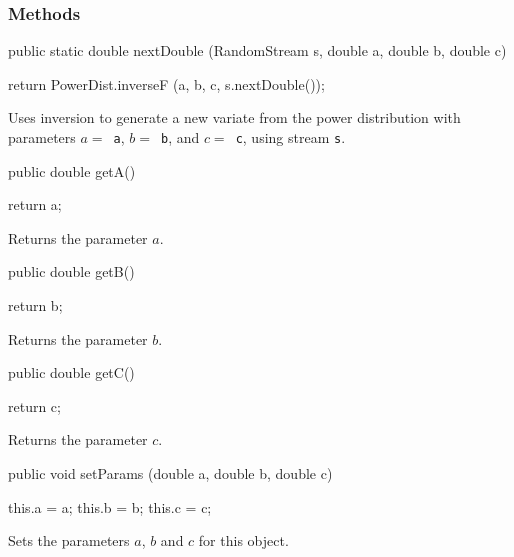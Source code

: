 \subsubsection* {Methods}
\begin{code}

   public static double nextDouble (RandomStream s, double a, double b,
                                    double c) \begin{hide} {
       return PowerDist.inverseF (a, b, c, s.nextDouble());
   }\end{hide}
\end{code}
\begin{tabb} 
   Uses inversion to generate a new variate from the power
   distribution with parameters $a = $~\texttt{a}, $b = $~\texttt{b}, and
   $c = $~\texttt{c}, using stream \texttt{s}.
\end{tabb}
\begin{code}

   public double getA()\begin{hide} {
      return a;
   }\end{hide}
\end{code} 
\begin{tabb} Returns the parameter $a$.
\end{tabb}
\begin{code}

   public double getB()\begin{hide} {
      return b;
   }\end{hide}
\end{code} 
\begin{tabb} Returns the parameter $b$.
\end{tabb}
\begin{code}

   public double getC()\begin{hide} {
      return c;
   }\end{hide}
\end{code} 
\begin{tabb} Returns the parameter $c$.
\end{tabb}
\begin{code}

   public void setParams (double a, double b, double c) \begin{hide} {
      this.a  = a;
      this.b  = b;
      this.c  = c;
   }\end{hide}
\end{code} 
\begin{tabb} Sets the parameters $a$, $b$ and $c$ for this object.
\end{tabb}
\begin{hide}\begin{code}
}
\end{code}
\end{hide}
